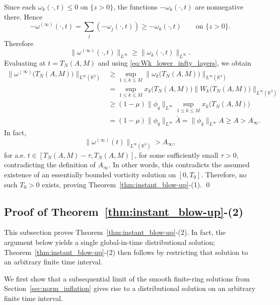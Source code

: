 \documentclass[reqno,11pt]{amsart}
\begin{document}
Since each \(\omega_k(\cdot,t)\le0\) on \(\{z>0\}\), the functions
\(-\omega_k(\cdot,t)\) are nonnegative there. Hence
\[
-\omega^{(\infty)}(\cdot,t)
=
\sum_j (-\omega_j(\cdot,t))
\ge
-\omega_k(\cdot,t)
\qquad\text{on }\{z>0\}.
\]
Therefore
\[
\|\omega^{(\infty)}(\cdot,t)\|_{L^\infty}
\ge
\|\omega_k(\cdot,t)\|_{L^\infty}.
\]
Evaluating at $t=T_N(A,M)$ and using \eqref{eq:Wk_lower_infty_layers}, we obtain
\begin{align*}
\Big\|\omega^{(\infty)}\big(T_N(A,M)\big)\Big\|_{L^\infty(\mathbb{R}^3)}
&\ge \sup_{1\le k\le M}\Big\|\omega_k\big(T_N(A,M)\big)\Big\|_{L^\infty(\mathbb{R}^3)}
\\
&= \sup_{1\le k\le M}x_k\big(T_N(A,M)\big)\Big\|W_k\big(T_N(A,M)\big)\Big\|_{L^\infty(\mathbb{R}^3)}
\\
&\ge (1-\mu)\|\phi_q\|_{L^\infty}\sup_{1\le k\le M}x_k\big(T_N(A,M)\big)
\\
&= (1-\mu)\|\phi_q\|_{L^\infty}\bar A
=\|\phi_q\|_{L^\infty}A\ge A>A_\infty.
\end{align*}
In fact, 
\[
\|\omega^{(\infty)}(t)\|_{L^\infty(\mathbb R^3)}>A_\infty,
\]
for a.e. $t\in[T_N(A,M)-\tau,T_N(A,M)]$, for some sufficiently small $\tau>0$,
contradicting the definition of $A_\infty$.
In other words, this contradicts the assumed existence of an essentially bounded vorticity solution on $[0,T_0]$. Therefore, no such $T_0>0$ exists, proving Theorem~\ref{thm:instant_blow-up}-(1).
\qed






















\subsection{Proof of Theorem~\ref{thm:instant_blow-up}-(2)}
\label{sec:pf_rem}
This subsection proves Theorem~\ref{thm:instant_blow-up}-(2). In fact, the argument below yields a single global-in-time distributional solution; Theorem~\ref{thm:instant_blow-up}-(2) then follows by restricting that solution to an arbitrary finite time interval.

We first show that a subsequential limit of the smooth finite-ring solutions from Section~\ref{sec:norm_inflation} gives rise to a distributional solution on an arbitrary finite time interval.
\end{document}
